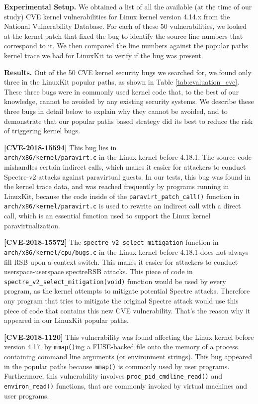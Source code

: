 \textbf{Experimental Setup.}
We obtained a list of all the available (at the time of our study) CVE kernel vulnerabilities for Linux kernel version 4.14.x from the National Vulnerability Database. 
For each of these 50 vulnerabilities, we looked at the kernel patch that fixed the bug to identify the source line numbers that correspond to it. 
We then compared the line numbers against the popular paths kernel trace we had for LinuxKit to verify if the bug was present.

\textbf{Results.}
Out of the 50 CVE kernel security bugs we searched for, we found only three in the LinuxKit popular paths, as shown in Table \ref{tab:evaluation_cve}. 
These three bugs were in commonly used kernel code that,   to the best of our knowledge, cannot be avoided by any existing security systems. 
We describe these three bugs in detail below to explain why they cannot be avoided, 
and to demonstrate that our popular paths based strategy did its best to reduce the risk of triggering kernel bugs.

\textbf{[CVE-2018-15594]}
This bug lies in \\
\verb|arch/x86/kernel/paravirt.c| in the Linux kernel before 4.18.1. 
The source code mishandles certain indirect calls, which makes it easier for attackers to conduct Spectre-v2 attacks against paravirtual guests. 
In our tests, this bug was found in the kernel trace data, and was reached frequently by programs running in LinuxKit, 
because the code inside of the \verb|paravirt_patch_call()| function in \\
\verb|arch/x86/kernel/paravirt.c| is used to rewrite an indirect call with a direct call, 
which is an essential function used to support the Linux kernel paravirtualization. 

\textbf{[CVE-2018-15572]}
The \verb|spectre_v2_select_mitigation| function in \verb|arch/x86/kernel/cpu/bugs.c| in the Linux kernel before 4.18.1 does not always fill RSB upon a context switch. 
This makes it easier for attackers to conduct userspace-userspace spectreRSB attacks. 
This piece of code in \\
\verb|spectre_v2_select_mitigation(void)| function would be used by every program, as the kernel attempts to mitigate potential Spectre attacks. 
Therefore any program that tries to mitigate the original Spectre attack would use this piece of code that contains this new CVE vulnerability. 
That's the reason why it appeared in our LinuxKit popular paths. 

\textbf{[CVE-2018-1120]}
This vulnerability was found affecting the Linux kernel before version 4.17. by \verb|mmap()|ing a FUSE-backed file onto 
the memory of a process containing command line arguments (or environment strings). 
This bug appeared in the popular paths because \verb|mmap()| is commonly used by user programs. 
Furthermore, this vulnerability involves \verb|proc_pid_cmdline_read()| and \verb|environ_read()| functions, that are commonly invoked by virtual machines and user programs.

